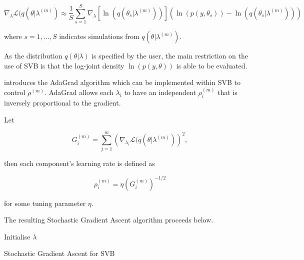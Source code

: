 \documentclass{article}\usepackage[]{graphicx}\usepackage[]{color}
\numberwithin{equation}{section}
\begin{document}
\begin{equation}
\label{SGA2}
\nabla_{\lambda}\mathcal{L}(q(\theta | \lambda^{(m)}) \approx \frac{1}{S}\sum_{s=1}^{S} \nabla_{\lambda} [\ln(q(\theta_s | \lambda^{(m)}))] (\ln (p(y, \theta_s)) - \ln(q(\theta_s | \lambda^{(m)})))
\end{equation}

where $s = 1, \dots, S$ indicates simulations from $q(\theta | \lambda^{(m)})$.

As the distribution $q(\theta | \lambda)$ is specified by the user, the main restriction on the use of SVB is that the log-joint density $\ln(p(y, \theta))$ is able to be evaluated.

\citet{Duchi2011} introduces the AdaGrad algorithm which can be implemented within SVB to control $\rho^{(m)}$. AdaGrad allows each $\lambda_i$ to have an independent $\rho^{(m)}_i$ that is inversely proportional to the gradient. 

Let 

\begin{equation}
\label{SGA3}
G_i^{(m)} = \sum_{j = 1}^{m} \left(\nabla_{\lambda_i}\mathcal{L}(q(\theta | \lambda^{(m)})\right)^2,
\end{equation}

then each component's learning rate is defined as

\begin{equation}
\label{SGA4}
\rho^{(m)}_i = \eta \left(G_i^{(m)}\right)^{-1/2}
\end{equation}

for some tuning parameter $\eta$.

The resulting Stochastic Gradient Ascent algorithm proceeds below.

\begin{algorithm}[H]
 Initialise $\lambda$\;
 \caption{Stochastic Gradient Ascent for SVB}
  \label{alg:algorithm2}
\end{algorithm}
\end{document}

